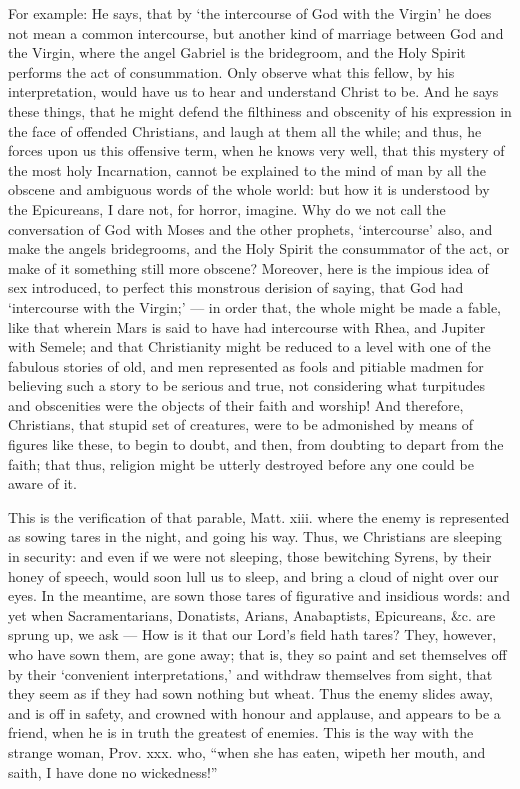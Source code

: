For example: He says, that by ‘the intercourse of God with the Virgin’ he does not mean a common intercourse, but another kind of marriage between God and the Virgin, where the angel Gabriel is the bridegroom, and the Holy Spirit performs the act of consummation. Only observe what this fellow, by his interpretation, would have us to hear and understand Christ to be. And he says these things, that he might defend the filthiness and obscenity of his expression in the face of offended Christians, and laugh at them all the while; and thus, he forces upon us this offensive term, when he knows very well, that this mystery of the most holy Incarnation, cannot be explained to the mind of man by all the obscene and ambiguous words of the whole world: but how it is understood by the Epicureans, I dare not, for horror, imagine. Why do we not call the conversation of God with Moses and the other prophets, ‘intercourse’ also, and make the angels bridegrooms, and the Holy Spirit the consummator of the act, or make of it something still more obscene? Moreover, here is the impious idea of sex introduced, to perfect this monstrous derision of saying, that God had ‘intercourse with the Virgin;’ — in order that, the whole might be made a fable, like that wherein Mars is said to have had intercourse with Rhea, and Jupiter with Semele; and that Christianity might be reduced to a level with one of the fabulous stories of old, and men represented as fools and pitiable madmen for believing such a story to be serious and true, not considering what turpitudes and obscenities were the objects of their faith and worship! And therefore, Christians, that stupid set of creatures, were to be admonished by means of figures like these, to begin to doubt, and then, from doubting to depart from the faith; that thus, religion might be utterly destroyed before any one could be aware of it.

This is the verification of that parable, Matt. xiii. where the enemy is represented as sowing tares in the night, and going his way. Thus, we Christians are sleeping in security: and even if we were not sleeping, those bewitching Syrens, by their honey of speech, would soon lull us to sleep, and bring a cloud of night over our eyes. In the meantime, are sown those tares of figurative and insidious words: and yet when Sacramentarians, Donatists, Arians, Anabaptists, Epicureans, \&c. are sprung up, we ask — How is it that our Lord’s field hath tares? They, however, who have sown them, are gone away; that is, they so paint and set themselves off by their ‘convenient interpretations,’ and withdraw themselves from sight, that they seem as if they had sown nothing but wheat. Thus the enemy slides away, and is off in safety, and crowned with honour and applause, and appears to be a friend, when he is in truth the greatest of enemies. This is the way with the strange woman, Prov. xxx. who, “when she has eaten, wipeth her mouth, and saith, I have done no wickedness!”

